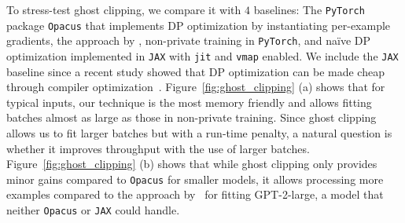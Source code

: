 To stress-test ghost clipping, we compare it with $4$ baselines: The \texttt{PyTorch} package \texttt{Opacus} that implements DP optimization by instantiating per-example gradients, the approach by \cite{lee2020scaling}, non-private training in \texttt{PyTorch}, and na\"ive DP optimization implemented in \texttt{JAX} with \texttt{jit} and \texttt{vmap} enabled. 
We include the \texttt{JAX} baseline since a recent study showed that DP optimization can be made cheap through compiler optimization~\citep{subramani2020enabling}.
Figure~\ref{fig:ghost_clipping} (a) shows that for typical inputs, our technique is the most memory friendly and allows fitting batches almost as large as those in non-private training. 
Since ghost clipping allows us to fit larger batches but with a run-time penalty, a natural question is whether it improves throughput with the use of larger batches. 
Figure~\ref{fig:ghost_clipping} (b) shows that while ghost clipping only provides minor gains compared to \texttt{Opacus} for smaller models, it allows processing  more examples compared to the approach by~\cite{lee2020scaling} for fitting GPT-2-large, a model that neither \texttt{Opacus} or \texttt{JAX} could handle. 
